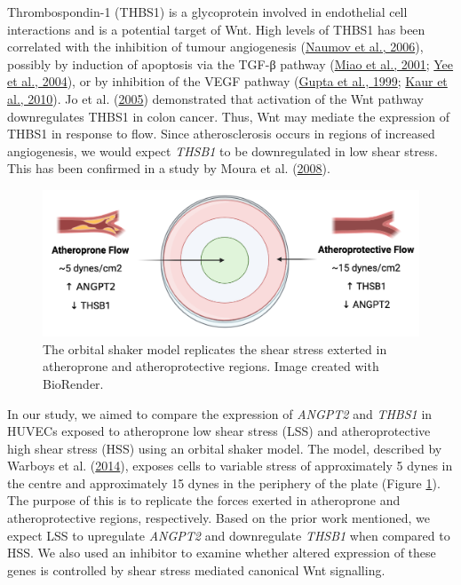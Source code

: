 \documentclass[
  11pt,
]{article}
\begin{document}
Thrombospondin-1 (THBS1) is a glycoprotein involved in endothelial cell interactions and is a potential target of Wnt.
High levels of THBS1 has been correlated with the inhibition of tumour angiogenesis (\protect\hyperlink{ref-naumov2006}{Naumov et al., 2006}), possibly by induction of apoptosis via the TGF-β pathway (\protect\hyperlink{ref-Miao2001}{Miao et al., 2001}; \protect\hyperlink{ref-yee2004}{Yee et al., 2004}), or by inhibition of the VEGF pathway (\protect\hyperlink{ref-gupta1999}{Gupta et al., 1999}; \protect\hyperlink{ref-kaur2010}{Kaur et al., 2010}).
Jo et al. (\protect\hyperlink{ref-jo2005}{2005}) demonstrated that activation of the Wnt pathway downregulates THBS1 in colon cancer.
Thus, Wnt may mediate the expression of THBS1 in response to flow.
Since atherosclerosis occurs in regions of increased angiogenesis, we would expect \emph{THSB1} to be downregulated in low shear stress.
This has been confirmed in a study by Moura et al. (\protect\hyperlink{ref-Moura2008}{2008}).

\begin{figure}

{\centering \includegraphics[width=0.8\linewidth]{../images/orbital} 

}

\caption{The orbital shaker model replicates the shear stress exterted in atheroprone and atheroprotective regions. Image created with BioRender.}\label{fig:orbital}
\end{figure}

In our study, we aimed to compare the expression of \emph{ANGPT2} and \emph{THBS1} in HUVECs exposed to atheroprone low shear stress (LSS) and atheroprotective high shear stress (HSS) using an orbital shaker model.
The model, described by Warboys et al. (\protect\hyperlink{ref-Warboys2014}{2014}), exposes cells to variable stress of approximately 5 dynes in the centre and approximately 15 dynes in the periphery of the plate (Figure \ref{fig:orbital}).
The purpose of this is to replicate the forces exerted in atheroprone and atheroprotective regions, respectively.
Based on the prior work mentioned, we expect LSS to upregulate \emph{ANGPT2} and downregulate \emph{THSB1} when compared to HSS.
We also used an inhibitor to examine whether altered expression of these genes is controlled by shear stress mediated canonical Wnt signalling.
\end{document}
